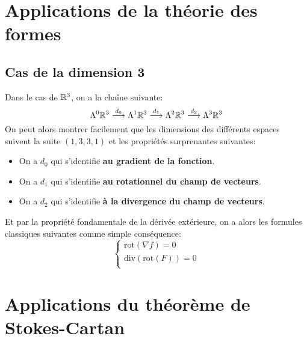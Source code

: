 \chapter{Applications de la théorie des formes}
   \section{Cas de la dimension 3}
   Dans le cas de \(\mathbb{R}^3\), on a la chaîne suivante:
   \[
      \Lambda^0 \mathbb{R}^3 \overset{d_0}{\longrightarrow} \Lambda^1 \mathbb{R}^3 \overset{d_1}{\longrightarrow} \Lambda^2 \mathbb{R}^3 \overset{d_2}{\longrightarrow} \Lambda^3 \mathbb{R}^3
   \]
   On peut alors montrer facilement que les dimensions des différents espaces suivent la suite \((1, 3, 3, 1)\) et les propriétés surprenantes suivantes:
   \begin{itemize}
      \item On a \(d_0\) qui s'identifie \textbf{au gradient de la fonction}.
      \item On a \(d_1\) qui s'identifie \textbf{au rotationnel du champ de vecteurs}.
      \item On a \(d_2\) qui s'identifie \textbf{à la divergence du champ de vecteurs}.
   \end{itemize}
   Et par la propriété fondamentale de la dérivée extérieure, on a alors les formules classiques suivantes comme simple conséquence:
   \[
      \begin{cases}
         \text{rot}(\nabla f) = 0\\
         \text{div}(\text{rot}(F)) = 0\\
      \end{cases}
   \]

\chapter{Applications du théorème de Stokes-Cartan}

